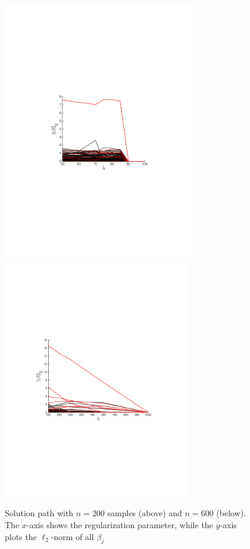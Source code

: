 \begin{figure}
\centering
\includegraphics[width=3.4in]{figs/solnpath200.pdf}
\includegraphics[width=3.2in]{figs/solnpath600.pdf}
\vspace{\imcaptionspace}
\caption[]{\small Solution path with $n=200$ samples (above) and
$n=600$ (below). The $x$-axis shows the regularization parameter,
while the $y$-axis plots the $\ell_2$-norm of all $\beta_j$ }
\vspace{\imtextspace}
\label{fig:n200}
\end{figure}

